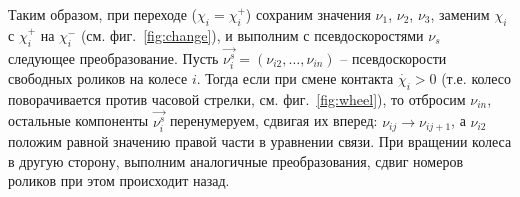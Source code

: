 Таким образом, при переходе ($\chi_i = \chi_i^+$) сохраним значения $\nu_1$, $\nu_2$, $\nu_3$, заменим $\chi_i$ с $\chi_i^+$ на $\chi_i^-$ (см. фиг.~\ref{fig:change}), и выполним с псевдоскоростями $\nu_s$ следующее преобразование. Пусть $\vec{\nu_i^s} = (\nu_{i2},\ldots,\nu_{in})$ -- псевдоскорости свободных роликов на колесе $i$. Тогда если при смене контакта $\dot{\chi_i} > 0$ (т.е. колесо поворачивается против часовой стрелки, см. фиг.~\ref{fig:wheel}), то отбросим $\nu_{in}$, остальные компоненты $\vec{\nu_i^s}$ перенумеруем, сдвигая их вперед: $\nu_{ij} \rightarrow \nu_{ij+1}$, а $\nu_{i2}$ положим равной значению правой части в уравнении связи. При вращении колеса в другую сторону, выполним аналогичные преобразования, сдвиг номеров роликов при этом происходит назад.
